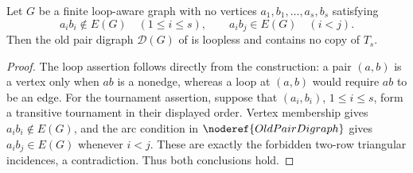 \begin{lemma}
Let $G$ be a finite loop-aware graph with no vertices
$a_1,b_1,\ldots,a_s,b_s$ satisfying
\[
 a_i b_i\notin E(G)\quad(1\leq i\leq s),
 \qquad a_i b_j\in E(G)\quad(i<j).
\]
Then the old pair digraph $\mathcal D(G)$ of
 is loopless and contains no copy of $T_s$.
\end{lemma}
\begin{proof}
The loop assertion follows directly from the construction: a pair $(a,b)$
is a vertex only when $ab$ is a nonedge, whereas a loop at $(a,b)$ would
require $ab$ to be an edge.  For the tournament assertion, suppose that
$(a_i,b_i)$, $1\leq i\leq s$, form a transitive tournament in their displayed
order.  Vertex membership gives $a_i b_i\notin E(G)$, and the arc condition
in $\noderef{OldPairDigraph}$ gives $a_i b_j\in E(G)$ whenever $i<j$.
These are exactly the forbidden two-row triangular incidences, a
contradiction.  Thus both conclusions hold.
\end{proof}
